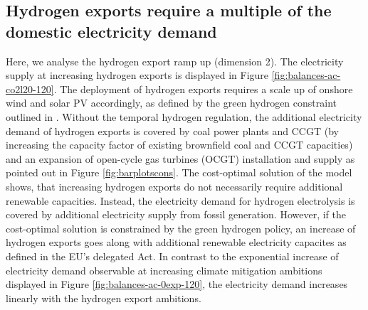 \subsection*{Hydrogen exports require a multiple of the domestic electricity demand}
\label{subsec:increase_h2}

Here, we analyse the hydrogen export ramp up (dimension 2). The electricity supply at increasing hydrogen exports is displayed in Figure \ref{fig:balances-ac-co2l20-120}. The deployment of hydrogen exports requires a scale up of onshore wind and solar PV accordingly, as defined by the green hydrogen constraint outlined in .
Without the temporal hydrogen regulation, the additional electricity demand of hydrogen exports is covered by coal power plants and CCGT (by increasing the capacity factor of existing brownfield coal and CCGT capacities) and an expansion of open-cycle gas turbines (OCGT) installation and supply as pointed out in Figure \ref{fig:barplotscons}.
The cost-optimal solution of the model shows, that increasing hydrogen exports do not necessarily require additional renewable capacities. Instead, the electricity demand for hydrogen electrolysis is covered by additional electricity supply from fossil generation. However, if the cost-optimal solution is constrained by the green hydrogen policy, an increase of hydrogen exports goes along with additional renewable electricity capacites as defined in the EU's delegated Act.
In contrast to the exponential increase of electricity demand observable at increasing climate mitigation ambitions displayed in Figure \ref{fig:balances-ac-0exp-120}, the electricity demand increases linearly with the hydrogen export ambitions.


